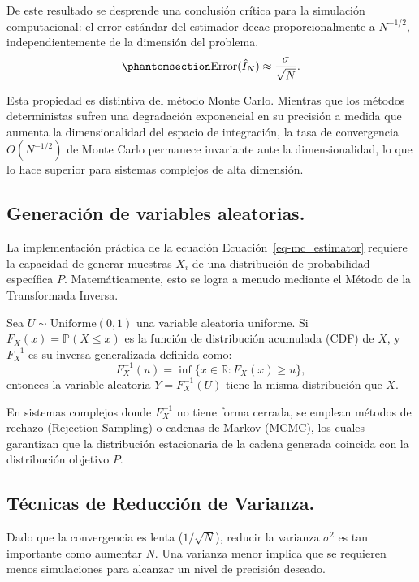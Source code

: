 \documentclass[
  spanish,
  us-letterpaper,
]{scrreprt}
\theoremstyle{plain}
\theoremstyle{plain}
\theoremstyle{definition}
\theoremstyle{remark}
\begin{document}
De este resultado se desprende una conclusión crítica para la simulación
computacional: el error estándar del estimador decae proporcionalmente a
\(N^{-1/2}\), independientemente de la dimensión del problema.
\begin{equation}\protect\phantomsection\label{eq-error_rate}{\text{Error}(\hat{I}_N) \approx \frac{\sigma}{\sqrt{N}}.}\end{equation}

Esta propiedad es distintiva del método Monte Carlo. Mientras que los
métodos deterministas sufren una degradación exponencial en su precisión
a medida que aumenta la dimensionalidad del espacio de integración, la
tasa de convergencia \(O(N^{-1/2})\) de Monte Carlo permanece invariante
ante la dimensionalidad, lo que lo hace superior para sistemas complejos
de alta dimensión.

\subsection{Generación de variables
aleatorias.}\label{generaciuxf3n-de-variables-aleatorias.}

La implementación práctica de la ecuación Ecuación~\ref{eq-mc_estimator}
requiere la capacidad de generar muestras \(X_i\) de una distribución de
probabilidad específica \(P\). Matemáticamente, esto se logra a menudo
mediante el Método de la Transformada Inversa.

Sea \(U \sim \text{Uniforme}(0,1)\) una variable aleatoria uniforme. Si
\(F_X(x) = \mathbb{P}(X \leq x)\) es la función de distribución
acumulada (CDF) de \(X\), y \(F_X^{-1}\) es su inversa generalizada
definida como:
\[F_X^{-1}(u) = \inf \{ x \in \mathbb{R} : F_X(x) \geq u \},\] entonces
la variable aleatoria \(Y = F_X^{-1}(U)\) tiene la misma distribución
que \(X\).

En sistemas complejos donde \(F_X^{-1}\) no tiene forma cerrada, se
emplean métodos de rechazo (Rejection Sampling) o cadenas de Markov
(MCMC), los cuales garantizan que la distribución estacionaria de la
cadena generada coincida con la distribución objetivo \(P\).

\subsection{Técnicas de Reducción de
Varianza.}\label{tuxe9cnicas-de-reducciuxf3n-de-varianza.}

Dado que la convergencia es lenta (\(1/\sqrt{N}\)), reducir la varianza
\(\sigma^2\) es tan importante como aumentar \(N\). Una varianza menor
implica que se requieren menos simulaciones para alcanzar un nivel de
precisión deseado.
\end{document}

